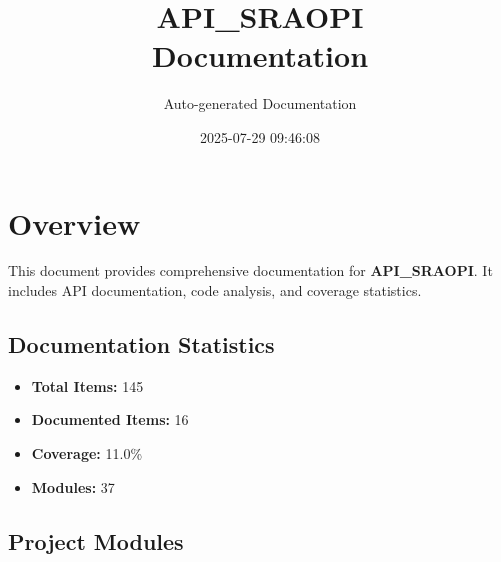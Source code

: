\documentclass[11pt,a4paper]{article}
\title{API_SRAOPI\\Documentation}
\author{Auto-generated Documentation}
\date{2025-07-29 09:46:08}
\begin{document}
\maketitle
\thispagestyle{empty}

\newpage
\tableofcontents
\newpage

\section{Overview}

This document provides comprehensive documentation for \textbf{API_SRAOPI}. It includes API documentation, code analysis, and coverage statistics.

\subsection{Documentation Statistics}

\begin{itemize}
    \item \textbf{Total Items:} 145
    \item \textbf{Documented Items:} 16
    \item \textbf{Coverage:} 11.0\%
    \item \textbf{Modules:} 37
\end{itemize}

\subsection{Project Modules}
\end{document}
